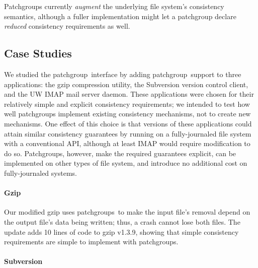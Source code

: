 \documentclass[9pt,twocolumn,letterpaper]{article}
\newcommand{\patchgroup}{patchgroup}
\newcommand{\patchgroups}{patchgroups}
\newcommand{\todo}[1]{\footnote{\textbf{TODO}: #1}}
\begin{document}
Patchgroups currently \emph{augment} the underlying file system's
consistency semantics, although a fuller implementation might let a
patchgroup declare \emph{reduced} consistency requirements as well.

\subsection{Case Studies}
\label{sec:patchgroup:casestudies}


We studied the \patchgroup\ interface by adding \patchgroup\ support to three
applications: the gzip compression utility, the Subversion version control
client, and the UW IMAP mail server daemon.
%
These applications were chosen for their relatively simple and explicit
consistency requirements; we intended to test how well patchgroups
implement existing consistency mechanisms, not to create new mechanisms.
One effect of this choice is that versions of
these applications could attain similar consistency guarantees
by running on a
fully-journaled file system with a conventional API, although at least IMAP
would require modification to do so.  Patchgroups, however,
make the required guarantees explicit, can be implemented on other types of
file system, and introduce no additional cost on fully-journaled systems.


\paragraph{Gzip}
\label{sec:patchgroup:gzip}

Our modified gzip uses \patchgroups\ to make the input file's
removal depend on the output file's data being written; thus,
a crash cannot lose both files. The update adds 10 lines of code to gzip
v1.3.9, showing that simple consistency requirements are simple to
implement with patchgroups.

\paragraph{Subversion}
\label{sec:patchgroup:svn}
\end{document}
